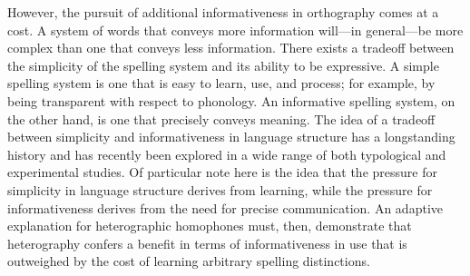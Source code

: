 \documentclass[doc,biblatex]{apa7}
\begin{document}

However, the pursuit of additional informativeness in orthography comes at a cost. A system of words that conveys more information will---in general---be more complex than one that conveys less information. There exists a tradeoff between the simplicity of the spelling system and its ability to be expressive. A simple spelling system is one that is easy to learn, use, and process; for example, by being transparent with respect to phonology. An informative spelling system, on the other hand, is one that precisely conveys meaning. The idea of a tradeoff between simplicity and informativeness in language structure has a longstanding history \parencite{Gabelentz:1891, Zipf:1949, Martinet:1952, Rosch:1978} and has recently been explored in a wide range of both typological \parencite{KempRegier:2012, Kemp:2018} and experimental \parencite{Kirby:2008, Kirby:2015} studies. Of particular note here is the idea that the pressure for simplicity in language structure derives from learning, while the pressure for informativeness derives from the need for precise communication. An adaptive explanation for heterographic homophones must, then, demonstrate that heterography confers a benefit in terms of informativeness in use that is outweighed by the cost of learning arbitrary spelling distinctions.

\end{document}
